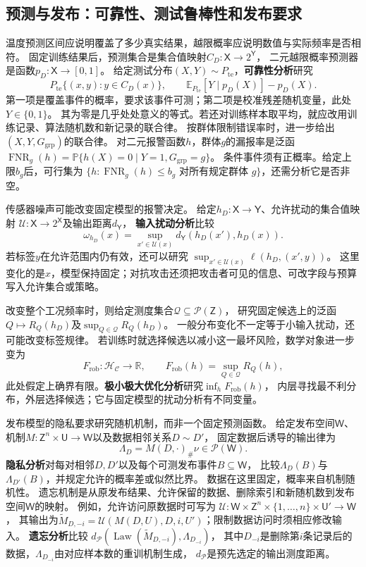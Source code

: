 \subsection{预测与发布：可靠性、测试鲁棒性和发布要求}
\label{sec:future-ml-deployment-requirements}

温度预测区间应说明覆盖了多少真实结果，越限概率应说明数值与实际频率是否相符。
固定训练结果后，预测集合是集合值映射$C_D:\mathsf X\to2^{\mathsf Y}$，
二元越限概率预测器是函数$p_D:\mathsf X\to[0,1]$。
给定测试分布$(X,Y)\sim P_{\mathrm{te}}$，\textbf{可靠性分析}研究
\[
  P_{\mathrm{te}}\{(x,y):y\in C_D(x)\},\qquad
  \mathbb E_{P_{\mathrm{te}}}[Y\mid p_D(X)]-p_D(X).
\]
第一项是覆盖事件的概率，要求该事件可测；第二项是校准残差随机变量，此处$Y\in\{0,1\}$。
其为零是几乎处处意义的等式。若还对训练样本取平均，就应改用训练记录、算法随机数和新记录的联合律。
按群体限制错误率时，进一步给出$(X,Y,G_{\mathrm{grp}})$的联合律。
对二元报警函数$h$，群体$g$的漏报率是泛函
$\operatorname{FNR}_g(h)=\mathbb P\{h(X)=0\mid Y=1,G_{\mathrm{grp}}=g\}$。
条件事件须有正概率。给定上限$b_g$后，可行集为
$\{h:\operatorname{FNR}_g(h)\leq b_g\text{ 对所有规定群体 }g\}$，还需分析它是否非空。

传感器噪声可能改变固定模型的报警决定。
给定$h_D:\mathsf X\to\mathsf Y$、允许扰动的集合值映射
$\mathcal U:\mathsf X\to2^{\mathsf X}$及输出距离$d_{\mathsf Y}$，
\textbf{输入扰动分析}比较
\[
  \omega_{h_D}(x)=\sup_{x'\in\mathcal U(x)}
                  d_{\mathsf Y}(h_D(x'),h_D(x)).
\]
若标签$y$在允许范围内仍有效，还可以研究
$\sup_{x'\in\mathcal U(x)}\ell(h_D,(x',y))$。
这里变化的是$x$，模型保持固定；对抗攻击还须把攻击者可见的信息、可改字段与预算写入允许集合或策略。

改变整个工况频率时，则给定测度集合$\mathcal Q\subseteq\mathcal P(\mathsf Z)$，
研究固定候选上的泛函$Q\mapsto R_Q(h_D)$及$\sup_{Q\in\mathcal Q}R_Q(h_D)$。
一般分布变化不一定等于小输入扰动，还可能改变标签规律。
若训练时就选择候选以减小这一最坏风险，数学对象进一步变为
\[
  F_{\mathrm{rob}}:\mathcal H_{\mathcal C}\to\mathbb R,
  \qquad F_{\mathrm{rob}}(h)=\sup_{Q\in\mathcal Q}R_Q(h),
\]
此处假定上确界有限。\textbf{极小极大优化分析}研究$\inf_hF_{\mathrm{rob}}(h)$，
内层寻找最不利分布，外层选择候选；它与固定模型的扰动分析有不同变量。

发布模型的隐私要求研究随机机制，而非一个固定预测函数。
给定发布空间$\mathsf W$、机制$M:\mathsf Z^n\times\mathsf U\to\mathsf W$以及数据相邻关系$D\sim D'$，
固定数据后诱导的输出律为
\[
  \Lambda_D=M(D,\cdot)_{\#}\nu\in\mathcal P(\mathsf W).
\]
\textbf{隐私分析}对每对相邻$D,D'$以及每个可测发布事件$B\subseteq\mathsf W$，
比较$\Lambda_D(B)$与$\Lambda_{D'}(B)$，并规定允许的概率差或似然比界。
数据在这里固定，概率来自机制随机性。
遗忘机制是从原发布结果、允许保留的数据、删除索引和新随机数到发布空间$\mathsf W$的映射。
例如，允许访问原数据时可写为
$\mathscr U:\mathsf W\times\mathsf Z^n\times\{1,\ldots,n\}\times\mathsf U'\to\mathsf W$，
其输出为$\widetilde M_{D,-i}=\mathscr U(M(D,U),D,i,U')$；限制数据访问时须相应修改输入。
\textbf{遗忘分析}比较
$d_{\mathcal P}(\operatorname{Law}(\widetilde M_{D,-i}),\Lambda_{D_{-i}})$，
其中$D_{-i}$是删除第$i$条记录后的数据，$\Lambda_{D_{-i}}$由对应样本数的重训机制生成，
$d_{\mathcal P}$是预先选定的输出测度距离。

